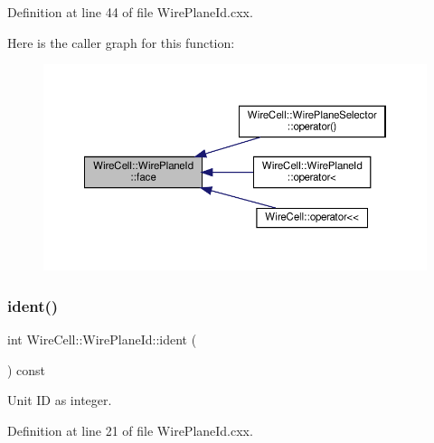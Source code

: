 Definition at line 44 of file Wire\+Plane\+Id.\+cxx.

Here is the caller graph for this function\+:
\nopagebreak
\begin{figure}[H]
\begin{center}
\leavevmode
\includegraphics[width=350pt]{class_wire_cell_1_1_wire_plane_id_a18de55bd3637c1586db6ab9e5f39da18_icgraph}
\end{center}
\end{figure}
\mbox{\label{class_wire_cell_1_1_wire_plane_id_adff770cfb3d3ddfa42ff55dbbb5cf0b9}} 
\subsubsection{\texorpdfstring{ident()}{ident()}}
{\footnotesize\ttfamily int Wire\+Cell\+::\+Wire\+Plane\+Id\+::ident (\begin{DoxyParamCaption}{ }\end{DoxyParamCaption}) const}



Unit ID as integer. 



Definition at line 21 of file Wire\+Plane\+Id.\+cxx.

